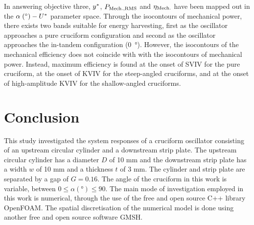 \documentclass[oneside]{utmthesis}
\begin{document}

In answering objective three, $y^{*}$, $P_{\text{Mech.,RMS}}$ and $\eta_{\text{Mech.}}$ have been mapped out in the $\alpha \; (\si{\degree})-\ured$ parameter space. Through the isocontours of mechanical power, there exists two bands suitable for energy harvesting, first as the oscillator approaches a pure cruciform configuration and second as the oscillator approaches the in-tandem configuration (\SI{0}{\degree}). However, the isocontours of the mechanical efficiency does not coincide with with the isocontours of mechanical power. Instead, maximum efficiency is found at the onset of SVIV for the pure cruciform, at the onset of KVIV for the steep-angled cruciforms, and at the onset of high-amplitude KVIV for the shallow-angled cruciforms.



\chapter{Conclusion} \label{chap:conclusion}
This study investigated the system responses of a cruciform oscillator consisting of an upstream circular cylinder and a downstream strip plate. The upstream circular cylinder has a diameter $D$ of 10 mm and the downstream strip plate has a width $w$ of 10 mm and a thickness $t$ of 3 mm.  The cylinder and strip plate are separated by a gap of $G = 0.16$. The angle of the cruciform in this work is variable, between $0 \leq \alpha (\si{\degree}) \leq 90$. The main mode of investigation employed in this work is numerical, through the use of the free and open source C++ library OpenFOAM. The spatial discretisation of the numerical model is done using another free and open source software GMSH.
\end{document}
